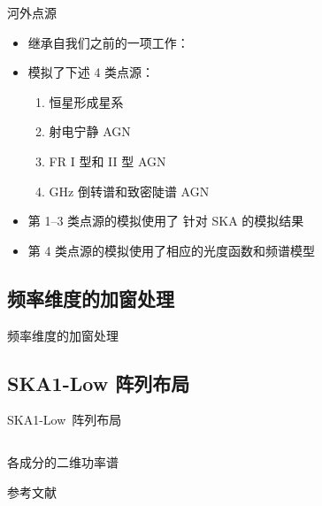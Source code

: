 \documentclass{beamer}
\begin{document}
\begin{frame}{河外点源}
  \begin{itemize}
    \item 继承自我们之前的一项工作：\cite{wang2010}
    \item 模拟了下述 4 类点源：
      \begin{enumerate}
        \item 恒星形成星系
        \item 射电宁静 AGN
        \item FR I 型和 II 型 AGN
        \item GHz 倒转谱和致密陡谱 AGN
      \end{enumerate}
    \item 第 1--3 类点源的模拟使用了 \cite{wilman2008} 针对 SKA 的模拟结果
    \item 第 4 类点源的模拟使用了相应的光度函数和频谱模型
  \end{itemize}
\end{frame}

\subsection{频率维度的加窗处理}

\begin{frame}{频率维度的加窗处理}
\end{frame}

\subsection{SKA1-Low 阵列布局}

\begin{frame}{SKA1-Low~阵列布局}
  \begin{columns}

  \end{columns}
\end{frame}

\begin{frame}{各成分的二维功率谱}
  \vspace{-1ex}
\end{frame}

\begin{frame}[allowframebreaks]{参考文献}
  \printbibliography[heading=none]
\end{frame}
\end{document}
